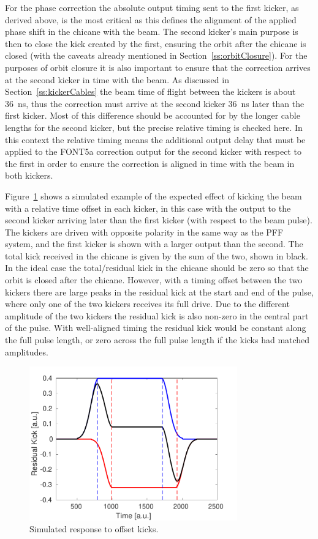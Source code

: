 For the phase correction the absolute output timing sent to the first kicker, as derived above, is the most critical as this defines the alignment of the applied phase shift in the chicane with the beam. The second kicker's main purpose is then to close the kick created by the first, ensuring the orbit after the chicane is closed (with the caveats already mentioned in Section~\ref{ss:orbitClosure}). For the purposes of orbit closure it is also important to ensure that the correction arrives at the second kicker in time with the beam. As discussed in Section~\ref{ss:kickerCables} the beam time of flight between the kickers is about 36~ns, thus the correction must arrive at the second kicker 36~ns later than the first kicker. Most of this difference should be accounted for by the longer cable lengths for the second kicker, but the precise relative timing is checked here. In this context the relative timing means the additional output delay that must be applied to the FONT5a correction output for the second kicker with respect to the first in order to ensure the correction is aligned in time with the beam in both kickers.

Figure~\ref{f:relDelay_sim} shows a simulated example of the expected effect of kicking the beam with a relative time offset in each kicker, in this case with the output to the second kicker arriving later than the first kicker (with respect to the beam pulse). The kickers are driven with opposite polarity in the same way as the PFF system, and the first kicker is shown with a larger output than the second. The total kick received in the chicane is given by the sum of the two, shown in black. In the ideal case the total/residual kick in the chicane should be zero so that the orbit is closed after the chicane. However, with a timing offset between the two kickers there are large peaks in the residual kick at the start and end of the pulse, where only one of the two kickers receives its full drive. Due to the different amplitude of the two kickers the residual kick is also non-zero in the central part of the pulse. With well-aligned timing the residual kick would be constant along the full pulse length, or zero across the full pulse length if the kicks had matched amplitudes.

\begin{figure}
  \centering
  \includegraphics[width=0.8\textwidth]{Figures/commissioning/relDelay_sim}
  \caption{Simulated response to offset kicks.}
  \label{f:relDelay_sim}
\end{figure}

